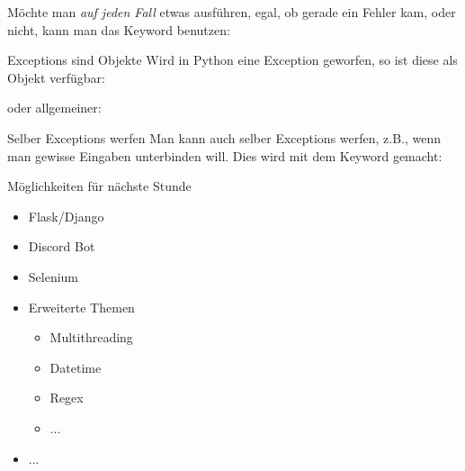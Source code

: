 \begin{frame}{}
	Möchte man \textit{auf jeden Fall} etwas ausführen, egal, ob gerade ein Fehler kam, oder nicht, kann man das Keyword  benutzen:
	
\end{frame}

\begin{frame}{Exceptions sind Objekte}
	Wird in Python eine Exception geworfen, so ist diese als Objekt verfügbar:
	
	oder allgemeiner:
	
\end{frame}

\begin{frame}{Selber Exceptions werfen}
	Man kann auch selber Exceptions werfen, z.B., wenn man gewisse Eingaben unterbinden will. Dies wird mit dem Keyword  gemacht:
	
\end{frame}

\begin{frame}{Möglichkeiten für nächste Stunde}
	\begin{itemize}
		\item Flask/Django
		\item Discord Bot
		\item Selenium
		\item Erweiterte Themen
		\begin{itemize}
			\item Multithreading
			\item Datetime
			\item Regex
			\item ...
		\end{itemize}
		\item ...
	\end{itemize}
\end{frame}



